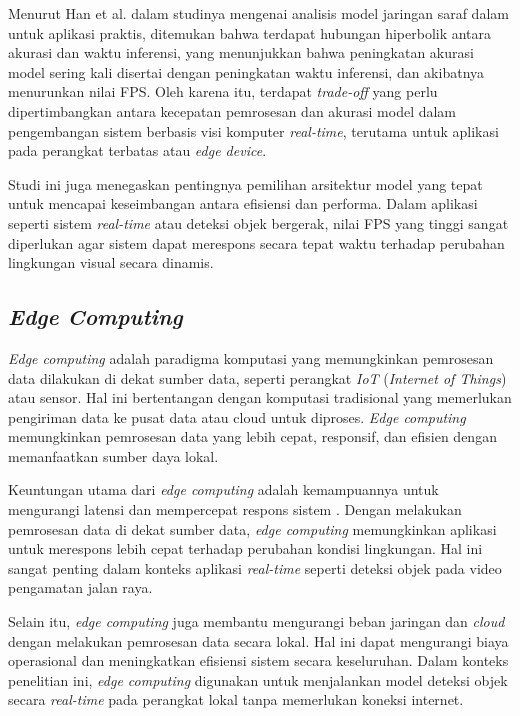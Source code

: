Menurut Han et al. \parencite*{Canziani2016An} dalam studinya mengenai analisis model jaringan saraf dalam untuk aplikasi praktis, ditemukan bahwa terdapat hubungan hiperbolik antara akurasi dan waktu inferensi, yang menunjukkan bahwa peningkatan akurasi model sering kali disertai dengan peningkatan waktu inferensi, dan akibatnya menurunkan nilai FPS. Oleh karena itu, terdapat \emph{trade-off} yang perlu dipertimbangkan antara kecepatan pemrosesan dan akurasi model dalam pengembangan sistem berbasis visi komputer \emph{real-time}, terutama untuk aplikasi pada perangkat terbatas atau \emph{edge device}.

Studi ini juga menegaskan pentingnya pemilihan arsitektur model yang tepat untuk mencapai keseimbangan antara efisiensi dan performa. Dalam aplikasi seperti sistem \emph{real-time} atau deteksi objek bergerak, nilai FPS yang tinggi sangat diperlukan agar sistem dapat merespons secara tepat waktu terhadap perubahan lingkungan visual secara dinamis.

\subsection{\emph{Edge Computing}}

\emph{Edge computing} adalah paradigma komputasi yang memungkinkan pemrosesan data dilakukan di dekat sumber data, seperti perangkat \emph{IoT} (\emph{Internet of Things}) atau sensor. Hal ini bertentangan dengan komputasi tradisional yang memerlukan pengiriman data ke pusat data atau cloud untuk diproses. \emph{Edge computing} memungkinkan pemrosesan data yang lebih cepat, responsif, dan efisien dengan memanfaatkan sumber daya lokal.

Keuntungan utama dari \emph{edge computing} adalah kemampuannya untuk mengurangi latensi dan mempercepat respons sistem \parencite*{aws2024}. Dengan melakukan pemrosesan data di dekat sumber data, \emph{edge computing} memungkinkan aplikasi untuk merespons lebih cepat terhadap perubahan kondisi lingkungan. Hal ini sangat penting dalam konteks aplikasi \emph{real-time} seperti deteksi objek pada video pengamatan jalan raya.

Selain itu, \emph{edge computing} juga membantu mengurangi beban jaringan dan \emph{cloud} dengan melakukan pemrosesan data secara lokal. Hal ini dapat mengurangi biaya operasional dan meningkatkan efisiensi sistem secara keseluruhan. Dalam konteks penelitian ini, \emph{edge computing} digunakan untuk menjalankan model deteksi objek secara \emph{real-time} pada perangkat lokal tanpa memerlukan koneksi internet. 

